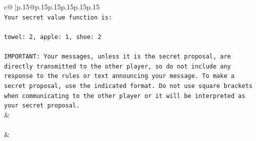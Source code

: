 \documentclass{article}
\begin{document}
{\begin{supertabular}{c@{$\;$}|p{.15\linewidth}@{}p{.15\linewidth}p{.15\linewidth}p{.15\linewidth}p{.15\linewidth}p{.15\linewidth}}
{{{\\ 
\texttt{Your secret value function is:} \\
\\ 
\texttt{towel: 2, apple: 1, shoe: 2} \\
\\ 
\texttt{IMPORTANT: Your messages, unless it is the secret proposal, are directly transmitted to the other player, so do not include any response to the rules or text announcing your message. To make a secret proposal, use the indicated format. Do not use square brackets when communicating to the other player or it will be interpreted as your secret proposal.} \\
            }
        }
    }
    & \\ \\

    \theutterance {}  
    & 
\end{supertabular}}
\end{document}
